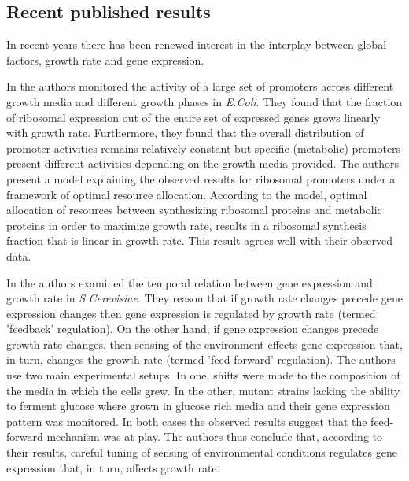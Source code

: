 \documentclass[a4page,notitlepage]{article}
\begin{document}
\subsection{Recent published results}
In recent years there has been renewed interest in the interplay between global factors, growth rate and gene expression.

In \parencite{Zaslaver2009a} the authors monitored the activity of a large set of promoters across different growth media and different growth phases in \emph{E.Coli}.
They found that the fraction of ribosomal expression out of the entire set of expressed genes grows linearly with growth rate.
Furthermore, they found that the overall distribution of promoter activities remains relatively constant but specific (metabolic) promoters present different activities depending on the growth media provided.
The authors present a model explaining the observed results for ribosomal promoters under a framework of optimal resource allocation.
According to the model, optimal allocation of resources between synthesizing ribosomal proteins and metabolic proteins in order to maximize growth rate, results in a ribosomal synthesis fraction that is linear in growth rate.
This result agrees well with their observed data.

In \parencite{Levy2009} the authors examined the temporal relation between gene expression and growth rate in \emph{S.Cerevisiae}.
They reason that if growth rate changes precede gene expression changes then gene expression is regulated by growth rate (termed 'feedback' regulation).
On the other hand, if gene expression changes precede growth rate changes, then sensing of the environment effects gene expression that, in turn, changes the growth rate (termed 'feed-forward' regulation).
The authors use two main experimental setups.
In one, shifts were made to the composition of the media in which the cells grew.
In the other, mutant strains lacking the ability to ferment glucose where grown in glucose rich media and their gene expression pattern was monitored.
In both cases the observed results suggest that the feed-forward mechanism was at play.
The authors thus conclude that, according to their results, careful tuning of sensing of environmental conditions regulates gene expression that, in turn, affects growth rate.
\end{document}
